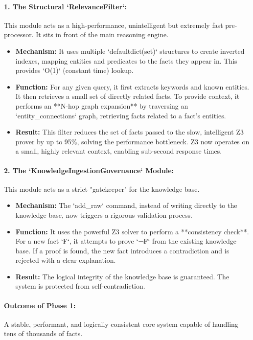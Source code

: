 \documentclass[11pt, a4paper]{article}
\begin{document}
\paragraph{1. The Structural `RelevanceFilter`:} This module acts as a high-performance, unintelligent but extremely fast pre-processor. It sits in front of the main reasoning engine.
\begin{itemize}
    \item \textbf{Mechanism:} It uses multiple `defaultdict(set)` structures to create inverted indexes, mapping entities and predicates to the facts they appear in. This provides `O(1)` (constant time) lookup.
    \item \textbf{Function:} For any given query, it first extracts keywords and known entities. It then retrieves a small set of directly related facts. To provide context, it performs an **N-hop graph expansion** by traversing an `entity_connections` graph, retrieving facts related to a fact's entities.
    \item \textbf{Result:} This filter reduces the set of facts passed to the slow, intelligent Z3 prover by up to 95\%, solving the performance bottleneck. Z3 now operates on a small, highly relevant context, enabling sub-second response times.
\end{itemize}

\paragraph{2. The `KnowledgeIngestionGovernance` Module:} This module acts as a strict "gatekeeper" for the knowledge base.
\begin{itemize}
    \item \textbf{Mechanism:} The `add_raw` command, instead of writing directly to the knowledge base, now triggers a rigorous validation process.
    \item \textbf{Function:} It uses the powerful Z3 solver to perform a **consistency check**. For a new fact `F`, it attempts to prove `¬F` from the existing knowledge base. If a proof is found, the new fact introduces a contradiction and is rejected with a clear explanation.
    \item \textbf{Result:} The logical integrity of the knowledge base is guaranteed. The system is protected from self-contradiction.
\end{itemize}

\paragraph{Outcome of Phase 1:} A stable, performant, and logically consistent core system capable of handling tens of thousands of facts.
\end{document}
